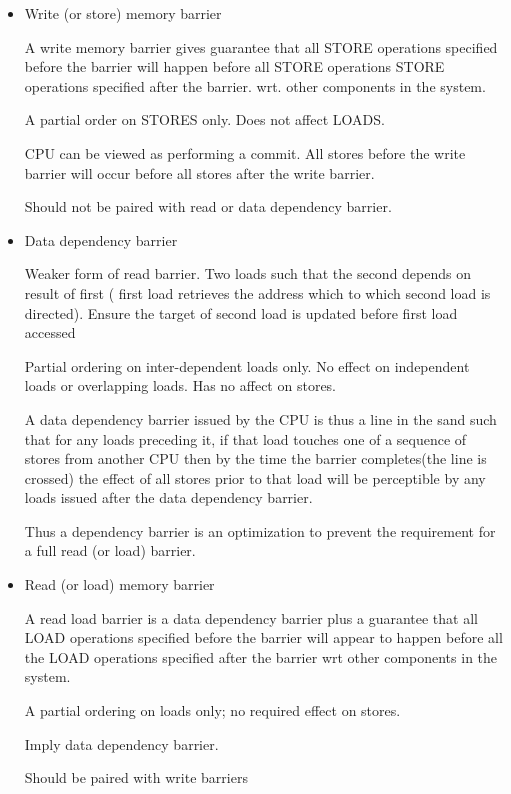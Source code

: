 \documentclass{article}
\begin{document}
\begin{itemize}
\item Write (or store) memory barrier

  A write memory barrier gives guarantee that all STORE operations
  specified before the barrier will happen before all STORE operations
  STORE operations specified after the barrier. wrt. other components
  in the system.

  A partial order on STORES only. Does not affect LOADS.

  CPU can be viewed as performing a commit. All stores before the
  write barrier will occur before all stores after the write barrier.

  Should not be paired with read or data dependency barrier.
  
\item Data dependency barrier

  Weaker form of read barrier. Two loads such that the second depends
  on result of first ( first load retrieves the address which to which
  second load is directed). Ensure the target of second load is
  updated before first load accessed %

  Partial ordering on inter-dependent loads only. No effect on
  independent loads or overlapping loads. Has no affect on stores.

  A data dependency barrier issued by the CPU is thus a line in the
  sand such that for any loads preceding it, if that load touches one
  of a sequence of stores from another CPU then by the time the
  barrier completes(the line is crossed) the effect of all stores
  prior to that load will be perceptible by any loads issued after the
  data dependency barrier.

  Thus a dependency barrier is an optimization to prevent the
  requirement for a full read (or load) barrier.


\item Read (or load) memory barrier

  A read load barrier is a data dependency barrier plus a guarantee
  that all LOAD operations specified before the barrier will appear to
  happen before all the LOAD operations specified after the barrier
  wrt other components in the system.

  A partial ordering on loads only; no required effect on stores.

  Imply data dependency barrier.

  Should be paired with write barriers %


\end{itemize}
\end{document}
